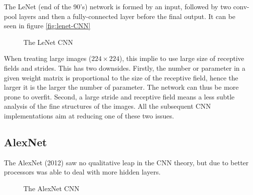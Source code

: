 The LeNet\cite{Lecun98gradient-basedlearning} (end of the 90's) network is formed by an input, followed by two conv-pool layers and then a fully-connected layer before the final output. It can be seen in figure \ref{fig:lenet-CNN} 
\begin{figure}[H]
\begin{center}
\caption{The LeNet CNN}
\end{center}
\end{figure}

When treating large images ($224\times 224$), this implie to use large size of receptive fields and strides. This has two downsides. Firstly, the number or parameter in a given weight matrix is proportional to the size of the receptive field, hence the larger it is the larger the number of parameter. The network can thus be more prone to overfit. Second, a large stride and receptive field means a less subtle analysis of the fine structures of the images. All the subsequent CNN implementations aim at reducing one of these two issues.

\subsection{AlexNet}

The AlexNet\cite{NIPS2012_4824} (2012) saw no qualitative leap in the CNN theory, but due to better processors was able to deal with more hidden layers.

\begin{figure}[H]
\begin{center}
\caption{The AlexNet CNN}
\end{center}
\end{figure}

